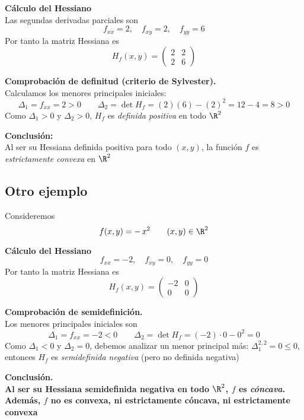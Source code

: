 \documentclass{article}
\begin{document}
\medskip

\noindent\textbf{Cálculo del Hessiano}\\
Las segundas derivadas parciales son
\[
f_{xx} = 2,\quad
f_{xy} = 2,\quad
f_{yy} = 6
\]
Por tanto la matriz Hessiana es
\[
H_f(x,y)
=\begin{pmatrix}
2 & 2\\[4pt]
2 & 6
\end{pmatrix}
\]

\medskip

\noindent\textbf{Comprobación de definitud (criterio de Sylvester).}\\
Calculamos los menores principales iniciales:
\[
\Delta_1 = f_{xx} = 2 > 0
\qquad
\Delta_2 = \det H_f = (2)(6) - (2)^2 = 12 - 4 = 8 > 0
\]
Como \(\Delta_1>0\) y \(\Delta_2>0\), \(H_f\) es \emph{definida positiva} en todo \(\R^2\)

\medskip

\noindent\textbf{Conclusión:}\\
{\color{teal}Al ser su Hessiana definida positiva para todo \((x,y)\), la función \(f\) es \emph{estrictamente convexa} en \(\R^2\)}

\subsection*{Otro ejemplo}

Consideremos 
\[
f(x,y) = -\,x^2
\qquad (x,y)\in\R^2
\]

\medskip
\noindent\textbf{Cálculo del Hessiano}\\
\[
f_{xx} = -2,\quad
f_{xy} = 0,\quad
f_{yy} = 0
\]
Por tanto la matriz Hessiana es
\[
H_f(x,y) = 
\begin{pmatrix}
-2 & 0\\[4pt]
0  & 0
\end{pmatrix}
\]

\medskip
\noindent\textbf{Comprobación de semidefinición.}\\
Los menores principales iniciales son
\[
\Delta_1 = f_{xx} = -2 < 0
\qquad
\Delta_2 = \det H_f = (-2)\cdot0 - 0^2 = 0
\]
Como \(\Delta_1<0\) y \(\Delta_2=0\), debemos analizar un menor principal más: \(\Delta_1^{2,2}=0\leq0\), entonces \(H_f\) es \emph{semidefinida negativa} (pero no definida negativa)

\medskip
\noindent\textbf{Conclusión.}\\
\textbf{\color{teal}Al ser su Hessiana semidefinida negativa en todo \(\R^2\), \(f\) es \emph{cóncava}.  
Además, \(f\) no es convexa, ni estrictamente cóncava, ni estrictamente convexa}
\end{document}
